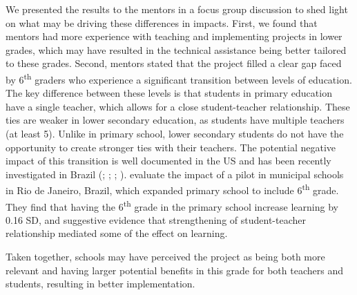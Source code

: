 \documentclass[11pt,a4paper]{article}
\begin{document}
We presented the results to the mentors in a focus group discussion to shed light on what may be driving these differences in impacts. First, we found that mentors had more experience with teaching and implementing projects in lower grades, which may have resulted in the technical assistance being better tailored to these grades. Second, mentors stated that the project filled a clear gap faced by 6\textsuperscript{th} graders who experience a significant transition between levels of education. The key difference between these levels is that students in primary education have a single teacher, which allows for a close student-teacher relationship. These ties are weaker in lower secondary education, as students have multiple teachers (at least 5). Unlike in primary school, lower secondary students do not have the opportunity to create stronger ties with their teachers. The potential negative impact of this transition is well documented in the US and has been recently investigated in Brazil (\citealp{bedard2005middle}; \citealp{cook2006should}; \citealp{hanewald2013transition}; \citealp{dos2017mais}). \cite{dos2017mais} evaluate the impact of a pilot in municipal schools in Rio de Janeiro, Brazil, which expanded primary school to include  6\textsuperscript{th} grade. They find that having the 6\textsuperscript{th} grade in the primary school increase learning by 0.16 SD, and suggestive evidence that strengthening of student-teacher relationship mediated some of the effect on learning.  

Taken together, schools may have perceived the project as being both more relevant and having larger potential benefits in this grade for both teachers and students, resulting in better implementation.
\end{document}
